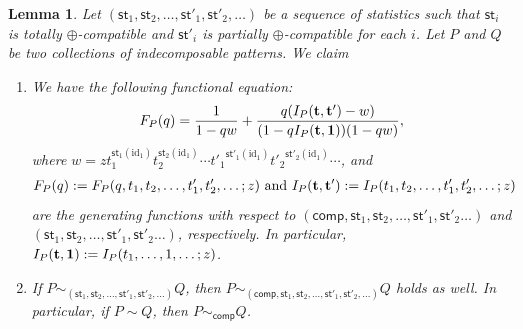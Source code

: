 \documentclass[12pt]{amsart}
\numberwithin{equation}{section}
\theoremstyle{plain}
\newtheorem{lemma}[theorem]{Lemma}
\theoremstyle{definition}
\def\comp{\mathsf{comp}}
\def\st{\mathsf{st}}
\def\id{\mathrm{id}}
\begin{document}
\begin{lemma} \label{general}
Let $(\st_1,\st_2,\ldots,\st'_1,\st'_2,\ldots)$ be a sequence of  statistics such that $\st_i$ is totally  $\oplus$-compatible  and $\st'_i$ is partially  $\oplus$-compatible for each $i$.
Let $P$ and $Q$ be two collections of indecomposable patterns. We claim
\begin{enumerate}
	\item We have the following functional equation:
	\begin{equation}\label{relation:comp}
	F_P(q)=\frac{1}{1-qw}+\frac{q(I_P({\bf t}, {\bf t'})-w)}{(1-qI_P({\bf t},{\bf 1}))(1-qw)},
	\end{equation}
	where $w=zt_1^{\st_1(\id_1)}t_2^{\st_2(\id_1)}\cdots {t'_1}^{\st'_1(\id_1)}{t'_2}^{\st'_2(\id_1)}\cdots$, and \begin{align*}F_P(q):=F_P(q,t_1,t_2,\ldots,t'_1,t'_2,\ldots;z) \text{ and } I_P({\bf t}, {\bf t'}):=I_P(t_1,t_2,\ldots, t'_1,t'_2,\ldots;z)
	\end{align*} 
	are the generating functions with respect to $(\comp,\st_1,\st_2,\ldots,\st'_1,\st'_2\ldots)$ and \linebreak $(\st_1,\st_2,\ldots,\st'_1,\st'_2\ldots)$, respectively. In particular, $I_P({\bf t},{\bf 1}):=I_P(t_1,\ldots, 1,\ldots;z)$.
	\item If $P\sim_{(\st_1,\st_2,\ldots,\st'_1,\st'_2,\ldots)}Q$, then $P\sim_{(\comp,\st_1,\st_2,\ldots,\st'_1,\st'_2,\ldots)}Q$ holds as well. In particular, if $P\sim Q$, then $P\sim_{\comp} Q$.
\end{enumerate}
\end{lemma}
\end{document}
